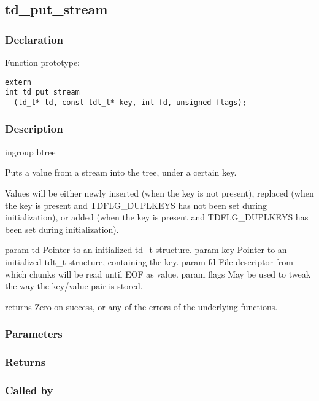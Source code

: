 
\newpage
\subsection{td\_put\_stream}
\subsubsection{Declaration} Function prototype:

\begin{verbatim}
extern
int td_put_stream
  (td_t* td, const tdt_t* key, int fd, unsigned flags);
\end{verbatim}

\subsubsection{Description}


 ingroup btree

 Puts a value from a stream into the tree, under a certain key.

 Values will be either newly inserted (when the key is not present),
 replaced (when the key is present and TDFLG\_DUPLKEYS has not been set during
 initialization), or added (when the key is present and TDFLG\_DUPLKEYS
 has been set during initialization).

 param td Pointer to an initialized td\_t structure.
 param key Pointer to an initialized tdt\_t structure, containing the key.
 param fd File descriptor from which chunks will be read until EOF as value.
 param flags May be used to tweak the way the key/value pair is stored.

 returns Zero on success, or any of the errors of the underlying
 functions.
 

\subsubsection{Parameters}
\subsubsection{Returns}
\subsubsection{Called by}
